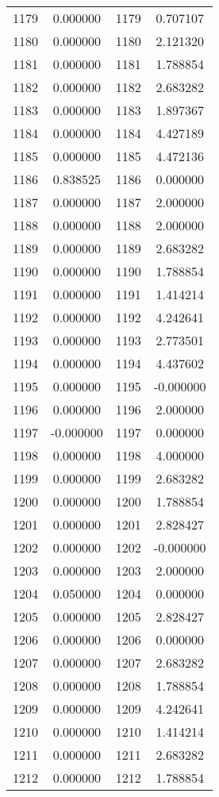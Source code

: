 \documentclass[12pt]{article}
\begin{document}
\begin{longtable}{@{}cccc@{}}
1179 & 0.000000 & 1179 & 0.707107 \\
1180 & 0.000000 & 1180 & 2.121320 \\
1181 & 0.000000 & 1181 & 1.788854 \\
1182 & 0.000000 & 1182 & 2.683282 \\
1183 & 0.000000 & 1183 & 1.897367 \\
1184 & 0.000000 & 1184 & 4.427189 \\
1185 & 0.000000 & 1185 & 4.472136 \\
1186 & 0.838525 & 1186 & 0.000000 \\
1187 & 0.000000 & 1187 & 2.000000 \\
1188 & 0.000000 & 1188 & 2.000000 \\
1189 & 0.000000 & 1189 & 2.683282 \\
1190 & 0.000000 & 1190 & 1.788854 \\
1191 & 0.000000 & 1191 & 1.414214 \\
1192 & 0.000000 & 1192 & 4.242641 \\
1193 & 0.000000 & 1193 & 2.773501 \\
1194 & 0.000000 & 1194 & 4.437602 \\
1195 & 0.000000 & 1195 & -0.000000 \\
1196 & 0.000000 & 1196 & 2.000000 \\
1197 & -0.000000 & 1197 & 0.000000 \\
1198 & 0.000000 & 1198 & 4.000000 \\
1199 & 0.000000 & 1199 & 2.683282 \\
1200 & 0.000000 & 1200 & 1.788854 \\
1201 & 0.000000 & 1201 & 2.828427 \\
1202 & 0.000000 & 1202 & -0.000000 \\
1203 & 0.000000 & 1203 & 2.000000 \\
1204 & 0.050000 & 1204 & 0.000000 \\
1205 & 0.000000 & 1205 & 2.828427 \\
1206 & 0.000000 & 1206 & 0.000000 \\
1207 & 0.000000 & 1207 & 2.683282 \\
1208 & 0.000000 & 1208 & 1.788854 \\
1209 & 0.000000 & 1209 & 4.242641 \\
1210 & 0.000000 & 1210 & 1.414214 \\
1211 & 0.000000 & 1211 & 2.683282 \\
1212 & 0.000000 & 1212 & 1.788854 \\

\end{longtable}
\end{document}
